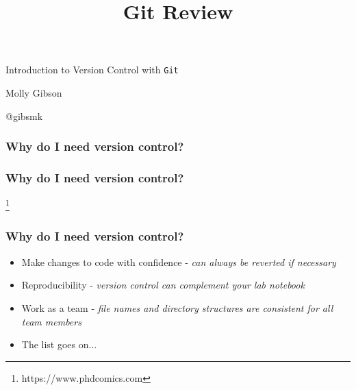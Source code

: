 \documentclass{beamer}
\title{Git Review}
\begin{document}
\begin{frame}
\begin{center}
Introduction to Version Control with \texttt{Git}
\vspace{30pt}

Molly Gibson

@gibsmk
\end{center}
\end{frame}

\begin{frame}
\frametitle{Why do I need version control?}
\end{frame}


\begin{frame}
\frametitle{Why do I need version control?}
\begin{center}
\end{center}
\footnote{\footnotesize{https://www.phdcomics.com}}
\end{frame}

\begin{frame}
\frametitle{Why do I need version control?}
\begin{itemize}
\item Make changes to code with confidence - \textit{can always be reverted if necessary} \pause
\item Reproducibility -  \textit{version control can complement your lab notebook} \pause
\item Work as a team -  \textit{file names and directory structures are consistent for all team members} \pause
\item The list goes on...
\end{itemize}
\end{frame}
\end{document}
